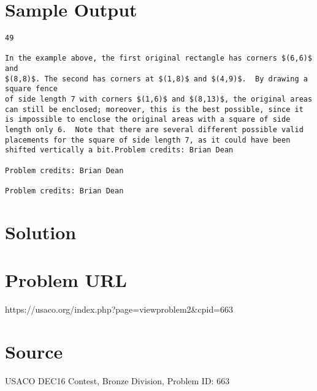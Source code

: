 \documentclass[12pt]{article}
\begin{document}
\section*{Sample Output}
\begin{verbatim}
49

In the example above, the first original rectangle has corners $(6,6)$ and
$(8,8)$. The second has corners at $(1,8)$ and $(4,9)$.  By drawing a square fence
of side length 7 with corners $(1,6)$ and $(8,13)$, the original areas can still be enclosed; moreover, this is the best possible, since it is impossible to enclose the original areas with a square of side length only 6.  Note that there are several different possible valid placements for the square of side length 7, as it could have been shifted vertically a bit.Problem credits: Brian Dean

Problem credits: Brian Dean

Problem credits: Brian Dean
\end{verbatim}

\section*{Solution}


\section*{Problem URL}
https://usaco.org/index.php?page=viewproblem2&cpid=663

\section*{Source}
USACO DEC16 Contest, Bronze Division, Problem ID: 663
\end{document}
